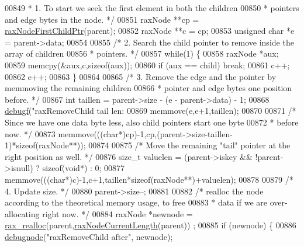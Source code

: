 \begin{DoxyCode}
{{{{{{{{{{{{00849 \textcolor{comment}{     * 1. To start we seek the first element in both the children}
00850 \textcolor{comment}{     *    pointers and edge bytes in the node. */}
00851     raxNode **cp = \hyperlink{rax_8c_aa94163a0d02b30219ef18e5a3ea06ca6}{raxNodeFirstChildPtr}(parent);
00852     raxNode **c = cp;
00853     \textcolor{keywordtype}{unsigned} \textcolor{keywordtype}{char} *e = parent->data;
00854 
00855     \textcolor{comment}{/* 2. Search the child pointer to remove inside the array of children}
00856 \textcolor{comment}{     *    pointers. */}
00857     \textcolor{keywordflow}{while}(1) \{
00858         raxNode *aux;
00859         memcpy(&aux,c,\textcolor{keyword}{sizeof}(aux));
00860         \textcolor{keywordflow}{if} (aux == child) \textcolor{keywordflow}{break};
00861         c++;
00862         e++;
00863     \}
00864 
00865     \textcolor{comment}{/* 3. Remove the edge and the pointer by memmoving the remaining children}
00866 \textcolor{comment}{     *    pointer and edge bytes one position before. */}
00867     \textcolor{keywordtype}{int} taillen = parent->size - (e - parent->data) - 1;
00868     \hyperlink{rax_8c_a10b215c81aa397dbc44adfb3e436befb}{debugf}(\textcolor{stringliteral}{"raxRemoveChild tail len: %
00869     memmove(e,e+1,taillen);
00870 
00871     \textcolor{comment}{/* Since we have one data byte less, also child pointers start one byte}
00872 \textcolor{comment}{     * before now. */}
00873     memmove(((\textcolor{keywordtype}{char}*)cp)-1,cp,(parent->size-taillen-1)*\textcolor{keyword}{sizeof}(raxNode**));
00874 
00875     \textcolor{comment}{/* Move the remaining "tail" pointer at the right position as well. */}
00876     size\_t valuelen = (parent->iskey && !parent->isnull) ? \textcolor{keyword}{sizeof}(\textcolor{keywordtype}{void}*) : 0;
00877     memmove(((\textcolor{keywordtype}{char}*)c)-1,c+1,taillen*\textcolor{keyword}{sizeof}(raxNode**)+valuelen);
00878 
00879     \textcolor{comment}{/* 4. Update size. */}
00880     parent->size--;
00881 
00882     \textcolor{comment}{/* realloc the node according to the theoretical memory usage, to free}
00883 \textcolor{comment}{     * data if we are over-allocating right now. */}
00884     raxNode *newnode = \hyperlink{rax__malloc_8h_a4aa041a0e1eaa6d8476e889547280467}{rax\_realloc}(parent,\hyperlink{rax_8c_a93300b0f45c900ba0bdb80f3f7a83f5e}{raxNodeCurrentLength}(parent))
      ;
00885     \textcolor{keywordflow}{if} (newnode) \{
00886         \hyperlink{rax_8c_a622b73fbdc398cdbfa8cc1fb87283cb4}{debugnode}(\textcolor{stringliteral}{"raxRemoveChild after"}, newnode);
}}}}}}}}}}}}}
\end{DoxyCode}

